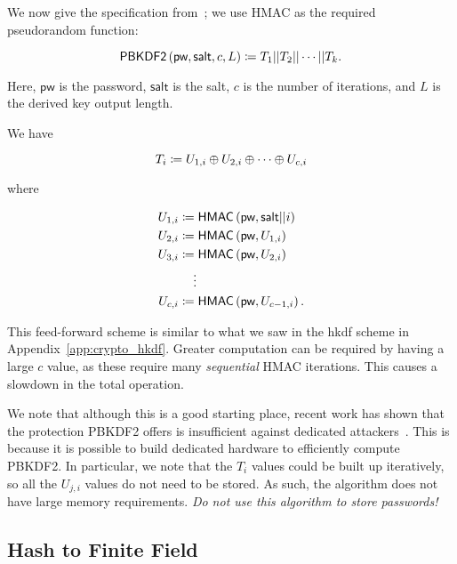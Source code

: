 We now give the specification from~\cite{rfc8018};
we use \textsf{HMAC} as the required pseudorandom function:

\begin{equation}
    \textsf{PBKDF2}\left( \textsf{pw}, \textsf{salt}, c, L \right)
        \coloneqq{} T_{1} || T_{2} || \cdots || T_{k}.
\end{equation}

\noindent
Here, $\textsf{pw}$ is the password,
$\textsf{salt}$ is the \gls{salt},
$c$ is the number of iterations,
and $L$ is the derived key output length.

We have

\begin{equation}
    T_{i} \coloneqq{} U_{1,i} \oplus U_{2,i} \oplus \cdots \oplus U_{c,i}
\end{equation}

\noindent
where

\begin{align}
    U_{1,i} &\coloneqq{} \textsf{HMAC}\left( \textsf{pw}, \textsf{salt} || i \right)
        \nonumber\\
    U_{2,i} &\coloneqq{} \textsf{HMAC}\left( \textsf{pw}, U_{1,i} \right)
        \nonumber\\
    U_{3,i} &\coloneqq{} \textsf{HMAC}\left( \textsf{pw}, U_{2,i} \right)
        \nonumber\\
        &\quad \vdots \nonumber\\
    U_{c,i} &\coloneqq{} \textsf{HMAC}\left( \textsf{pw}, U_{c-1,i} \right).
\end{align}

\noindent
This feed-forward scheme is similar to what we saw in the \gls{hkdf}
scheme in Appendix~\ref{app:crypto_hkdf}.
Greater computation can be required by having a large $c$ value,
as these require many \emph{sequential} \textsf{HMAC} iterations.
This causes a slowdown in the total operation.

We note that although this is a good starting place,
recent work has shown that the protection PBKDF2 offers
is insufficient against dedicated attackers~\cite{blocki2018economics}.
This is because it is possible to build dedicated hardware
to efficiently compute PBKDF2.
In particular, we note that the $T_{i}$ values could be built up
iteratively, so all the $U_{j,i}$ values do not need to be stored.
As such, the algorithm does not have large memory requirements.
\emph{Do not use this algorithm to store passwords!}


\subsection{Hash to Finite Field}
\label{app:crypto_hash-to-finite-field}

